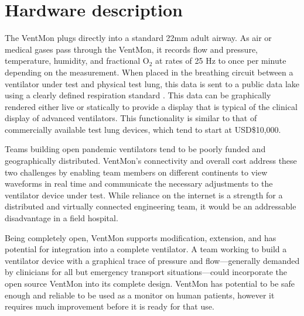 \documentclass[11pt, letterpaper]{article}
\begin{document}
\section{Hardware description}


The VentMon plugs directly into a standard 22mm adult airway. As air or medical gases pass through the VentMon, it records flow and pressure, temperature, humidity, and fractional O$_2$ at rates of 25 Hz to once per minute depending on the measurement. When placed in the breathing circuit between a ventilator under test and physical test lung, this data is sent to a public data lake \cite{VentDisplay} using a clearly defined respiration standard \cite{PIRDS}. This data can be graphically rendered either live or statically to provide a display that is typical of the clinical display of advanced ventilators. This functionality is similar to that of commercially available test lung devices, which tend to start at USD\$10,000.

Teams building open pandemic ventilators tend to be poorly funded and geographically distributed. VentMon's connectivity and overall cost address these two challenges by enabling team members on different continents to view waveforms in real time and communicate the necessary adjustments to the ventilator device under test. While reliance on the internet is a strength for a distributed and virtually connected engineering team, it would be an addressable disadvantage in a field hospital.

Being completely open, VentMon supports modification, extension, and has potential for integration into a complete ventilator. A team working to build a ventilator device with a graphical trace of pressure and flow---generally demanded by clinicians for all but emergency transport situations---could incorporate the open source VentMon into its complete design. VentMon has potential to be safe enough and reliable to be used as a monitor on human patients, however it requires much improvement before it is ready for that use.
\\
\end{document}
